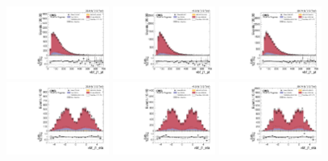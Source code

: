 \begin{figure}[!ht]
  \centering
  \includegraphics[width=0.30\textwidth]{analysis_plots/2016_zjj/cr_vjets_l/vbf_j1_pt.pdf}
  \includegraphics[width=0.30\textwidth]{analysis_plots/2017_zjj/cr_vjets_l/vbf_j1_pt.pdf}
  \includegraphics[width=0.30\textwidth]{analysis_plots/2018_zjj/cr_vjets_l/vbf_j1_pt.pdf} \\
  \includegraphics[width=0.30\textwidth]{analysis_plots/2016_zjj/cr_vjets_l/vbf_j1_eta.pdf}
  \includegraphics[width=0.30\textwidth]{analysis_plots/2017_zjj/cr_vjets_l/vbf_j1_eta.pdf}
  \includegraphics[width=0.30\textwidth]{analysis_plots/2018_zjj/cr_vjets_l/vbf_j1_eta.pdf} \\

\end{figure}
